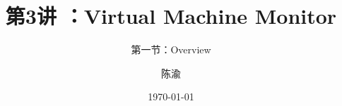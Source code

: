 


\title[第3讲]{第3讲 ：Virtual Machine Monitor} %
\subtitle{第一节：Overview }
\author{陈渝} %
\date{\today} %




\begin{frame}
\titlepage %
\end{frame}

